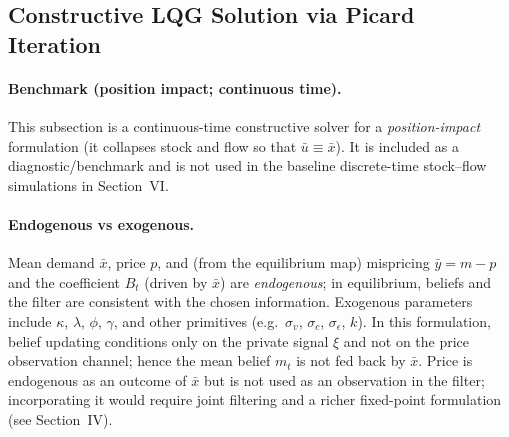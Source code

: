 
\subsection{Constructive LQG Solution via Picard Iteration}
\label{sec:lqg_constructive}

\paragraph{Benchmark (position impact; continuous time).}
This subsection is a continuous-time constructive solver for a \emph{position-impact} formulation (it collapses stock and flow so that $\bar u\equiv \bar x$).
It is included as a diagnostic/benchmark and is not used in the baseline discrete-time stock--flow simulations in Section~VI.

\paragraph{Endogenous vs exogenous.}
Mean demand $\bar x$, price $p$, and (from the equilibrium map) mispricing $\bar y = m - p$ and the coefficient $B_t$ (driven by $\bar x$) are \emph{endogenous}; in equilibrium, beliefs and the filter are consistent with the chosen information. Exogenous parameters include $\kappa$, $\lambda$, $\phi$, $\gamma$, and other primitives (e.g.\ $\sigma_v$, $\sigma_c$, $\sigma_\epsilon$, $k$). In this formulation, belief updating conditions only on the private signal $\xi$ and not on the price observation channel; hence the mean belief $m_t$ is not fed back by $\bar x$. Price is endogenous as an outcome of $\bar x$ but is not used as an observation in the filter; incorporating it would require joint filtering and a richer fixed-point formulation (see Section~IV).

